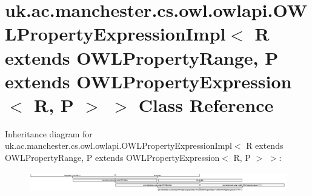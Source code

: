 \hypertarget{classuk_1_1ac_1_1manchester_1_1cs_1_1owl_1_1owlapi_1_1_o_w_l_property_expression_impl_3_01_r_01e672e5abee4203a562fc61711ec3f6ded}{\section{uk.\-ac.\-manchester.\-cs.\-owl.\-owlapi.\-O\-W\-L\-Property\-Expression\-Impl$<$ R extends O\-W\-L\-Property\-Range, P extends O\-W\-L\-Property\-Expression$<$ R, P $>$ $>$ Class Reference}
\label{classuk_1_1ac_1_1manchester_1_1cs_1_1owl_1_1owlapi_1_1_o_w_l_property_expression_impl_3_01_r_01e672e5abee4203a562fc61711ec3f6ded}
}
Inheritance diagram for uk.\-ac.\-manchester.\-cs.\-owl.\-owlapi.\-O\-W\-L\-Property\-Expression\-Impl$<$ R extends O\-W\-L\-Property\-Range, P extends O\-W\-L\-Property\-Expression$<$ R, P $>$ $>$\-:\begin{figure}[H]
\begin{center}
\leavevmode
\includegraphics[height=0.909460cm]{classuk_1_1ac_1_1manchester_1_1cs_1_1owl_1_1owlapi_1_1_o_w_l_property_expression_impl_3_01_r_01e672e5abee4203a562fc61711ec3f6ded}
\end{center}
\end{figure}
